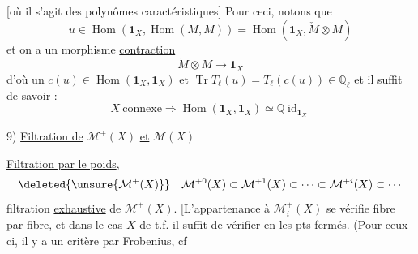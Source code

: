 [où il s'agit des polynômes caractéristiques]
Pour ceci, notons que
\[
u\in\operatorname{Hom}(\mathbf1_X,\operatorname{Hom}(M,M))
=\operatorname{Hom}(\mathbf1_X,\check M\otimes M)
\]
et on a un morphisme \uline{contraction}
\[
\check M\otimes M\longrightarrow\mathbf1_X
\]
d'où un $c(u)\in\operatorname{Hom}(\mathbf1_X,\mathbf1_X)$
et  $\operatorname{Tr}T_\ell(u)=T_\ell(c(u))\in\mathbb{Q}_\ell$
et il suffit de savoir :
\[
\boxed{X\ \text{connexe}\Longrightarrow
\operatorname{Hom}(\mathbf1_X,\mathbf1_X)\simeq\mathbb{Q}\operatorname{id}_{\mathbf1_X}}
\]

9) \uline{Filtration de} $\mathcal{M}^+(X)$ \uline{et} $\mathcal{M}(X)$

 \uline{Filtration par le poids},
\[
\deleted{\unsure{\mathcal{M}^+(X)}}\quad
\mathcal{M}^{+0}(X)\subset \mathcal{M}^{+1}(X)\subset\cdots\subset \mathcal{M}^{+i}(X)\subset\cdots
\]
filtration \uline{exhaustive} de $\mathcal{M}^+(X)$. [L'appartenance
à $\mathcal{M}_i^+(X)$ se vérifie fibre par fibre,
et dans le cas $X$ de t.f.  il suffit de
vérifier en les pts fermés. (Pour ceux-
ci, il y a un critère par Frobenius, cf
